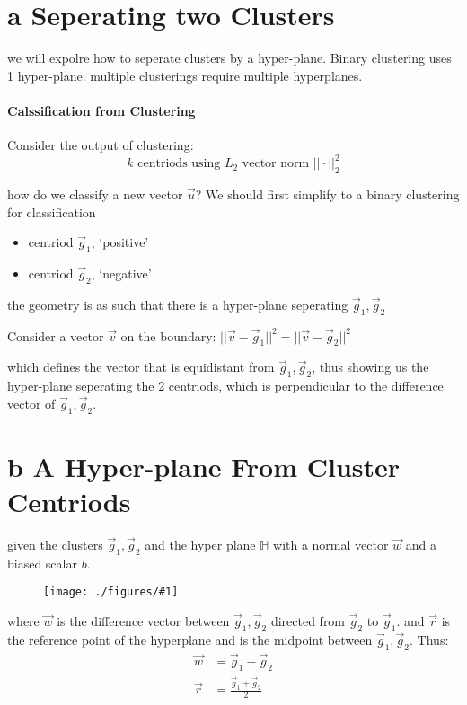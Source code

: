 \documentclass[12pt]{book}
\title{\coursetitle\linebreak\lecturename}
\author{\\Cain Susko\\ 
           \\ \\ \\
      Queen's University 
    \\School of Computing\\}
\newcommand{\incimg}[2]{%
       \begin{figure}[h]
               \centering
               \texttt{[image: ./figures/\#1]}
       \end{figure}
}
\begin{document}
\begin{titlepage}
        \maketitle
\end{titlepage}


\section*{a Seperating two Clusters}
we will expolre how to seperate clusters by a hyper-plane. Binary clustering
uses 1 hyper-plane. multiple clusterings require multiple hyperplanes.

\paragraph{Calssification from Clustering}
Consider the output of clustering:
\[k\text{ centriods using }L_2 \text{ vector norm }||\cdot||^2_2\]

how do we classify a new vector $\vec u$? We should first simplify to a 
binary clustering for classification
\begin{itemize}
        \item centriod $\vec g_1$, `positive'
        \item centriod $\vec g_2$, `negative'
\end{itemize}

the geometry is as such that there is a hyper-plane seperating 
$\vec g_1, \vec g_2$

Consider a vector $\vec v$ on the boundary: 
$||\vec v - \vec g_1||^2 = ||\vec v - \vec g_2||^2$

which defines the vector that is equidistant from $\vec g_1, \vec g_2$, thus 
showing us the hyper-plane seperating the 2 centriods, which is perpendicular
to the difference vector of $\vec g_1, \vec g_2$.

\section*{b A Hyper-plane From Cluster Centriods}
given the clusters $\vec g_1, \vec g_2$ and the hyper plane $\mathbb{H}$
with a normal vector $\vec w$ and a biased scalar $b$.
\incimg{hyperplane1}{1}

where $\vec w$ is the difference vector between $\vec g_1, \vec g_2$ directed
from $\vec g_2$ to $\vec g_1$. and $\vec r$ is the reference point of the 
hyperplane and is the midpoint between $\vec g_1, \vec g_2$. Thus:
\begin{align*}
        \vec w &= \vec g_1 - \vec g_2\\
        \vec r &= \frac{\vec g_1 + \vec g_2}{2}
\end{align*}
\end{document}
